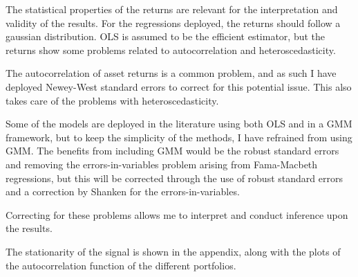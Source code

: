 The statistical properties of the returns are relevant for the interpretation and validity of the results. For the regressions deployed, the returns should follow a gaussian distribution. OLS is assumed to be the efficient estimator, but the returns show some problems related to autocorrelation and heteroscedasticity. 

The autocorrelation of asset returns is a common problem, and as such I have deployed Newey-West standard errors to correct for this potential issue. This also takes care of the problems with heteroscedasticity.

Some of the models are deployed in the literature using both OLS and in a GMM framework, but to keep the simplicity of the methods, I have refrained from using GMM. The benefits from including GMM would be the robust standard errors and removing the errors-in-variables problem arising from Fama-Macbeth regressions, but this will be corrected through the use of robust standard errors and a correction by Shanken for the errors-in-variables. 

Correcting for these problems allows me to interpret and conduct inference upon the results.

The stationarity of the signal is shown in the appendix, along with the plots of the autocorrelation function of the different portfolios. 



